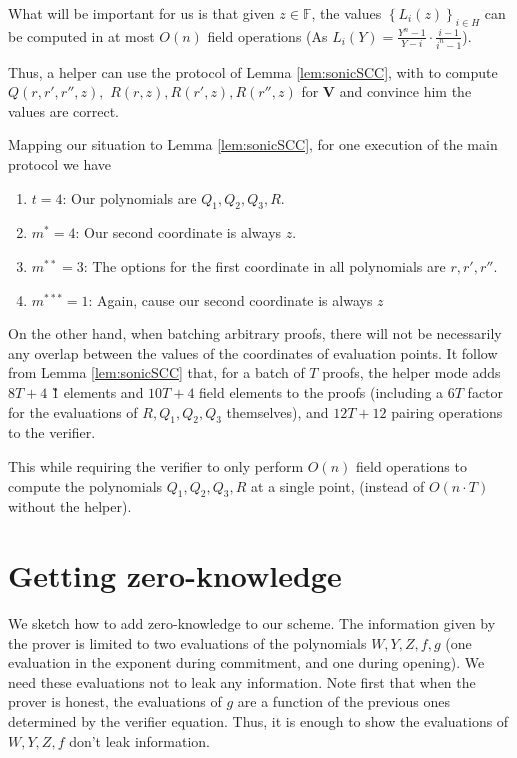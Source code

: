\documentclass[11pt]{article}
\numberwithin{figure}{section} %
\newcommand{\set}[1]{\ensuremath{\left\{#1\right\}}\xspace}
\newcommand{\F}{\ensuremath{\mathbb F}\xspace}
\newcommand{\sett}[2]{\ensuremath{\set{#1}_{#2}}\xspace}
\newcommand{\ver}{\ensuremath{\mathsf{\mathbf{V}}}\xspace}
\begin{document}
What will be important for us is that given $z\in \F$, the values \sett{L_i(z)}{i\in H} can be computed in at most $O(n)$ field operations (As $L_i(Y)=\frac{Y^n-1}{Y-i}\cdot\frac{i-1}{i^n-1}$).

Thus, a helper can use the protocol of Lemma \ref{lem:sonicSCC}, with to compute $Q(r,r',r'',z),$ $R(r,z),R(r',z),R(r'',z)$ for \ver and convince him the values are correct.

Mapping our situation to Lemma \ref{lem:sonicSCC}, for one execution of the main protocol we have
\begin{enumerate}
 \item $t=4$: Our polynomials are $Q_1,Q_2,Q_3,R$.
 \item $m^* = 4$: Our second coordinate is always $z$.
 \item $m^{**} =3$: The options for the first coordinate in all polynomials are $r,r',r''$.
 \item $m^{***}=1$: Again, cause our second coordinate is always $z$
\end{enumerate}

On the other hand, when batching arbitrary proofs, there will not be necessarily any overlap between the values of the coordinates of evaluation points.
It follow from Lemma \ref{lem:sonicSCC} that, for a batch of $T$ proofs, the helper mode adds $8T+4$ \G1 elements and $10T+4$ field elements to the proofs (including a $6T$ factor for the evaluations of $R,Q_1,Q_2,Q_3$ themselves),
and $12T+12$ pairing operations to the verifier.

This while requiring the verifier to only perform $O(n)$ field operations to compute the polynomials $Q_1,Q_2,Q_3,R$ at a single point, (instead of $O(n\cdot T)$ without the helper).



\section{Getting zero-knowledge}\label{sec:zk}
We sketch how to add zero-knowledge to our scheme.
The information given by the prover is limited to two evaluations of 
the polynomials $W,Y,Z,f,g$ (one evaluation in the exponent during commitment, and one during opening).
We need these evaluations not to leak any information.
Note first that when the prover is honest, the evaluations of $g$ are a function of the previous ones determined by the verifier equation.
Thus, it is enough to show the evaluations of $W,Y,Z,f$ don't leak information.
\end{document}

